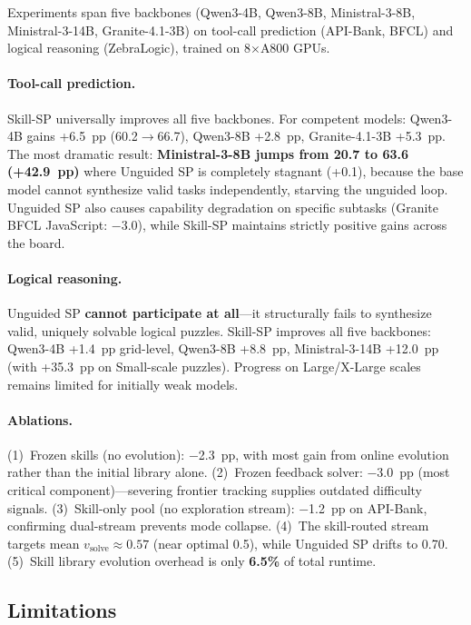 \documentclass[11pt,a4paper]{article}
\begin{document}
Experiments span five backbones (Qwen3-4B, Qwen3-8B, Ministral-3-8B, Ministral-3-14B, Granite-4.1-3B) on tool-call prediction (API-Bank, BFCL) and logical reasoning (ZebraLogic), trained on 8$\times$A800 GPUs.

\paragraph{Tool-call prediction.}
Skill-SP universally improves all five backbones. For competent models: Qwen3-4B gains +6.5~pp (60.2$\to$66.7), Qwen3-8B +2.8~pp, Granite-4.1-3B +5.3~pp. The most dramatic result: \textbf{Ministral-3-8B jumps from 20.7 to 63.6 (+42.9~pp)} where Unguided SP is completely stagnant (+0.1), because the base model cannot synthesize valid tasks independently, starving the unguided loop. Unguided SP also causes capability degradation on specific subtasks (Granite BFCL JavaScript: $-$3.0), while Skill-SP maintains strictly positive gains across the board.

\paragraph{Logical reasoning.}
Unguided SP \textbf{cannot participate at all}---it structurally fails to synthesize valid, uniquely solvable logical puzzles. Skill-SP improves all five backbones: Qwen3-4B +1.4~pp grid-level, Qwen3-8B +8.8~pp, Ministral-3-14B +12.0~pp (with +35.3~pp on Small-scale puzzles). Progress on Large/X-Large scales remains limited for initially weak models.

\paragraph{Ablations.}
(1)~Frozen skills (no evolution): $-$2.3~pp, with most gain from online evolution rather than the initial library alone. (2)~Frozen feedback solver: $-$3.0~pp (most critical component)---severing frontier tracking supplies outdated difficulty signals. (3)~Skill-only pool (no exploration stream): $-$1.2~pp on API-Bank, confirming dual-stream prevents mode collapse. (4)~The skill-routed stream targets mean $v_{\text{solve}} \approx 0.57$ (near optimal 0.5), while Unguided SP drifts to 0.70. (5)~Skill library evolution overhead is only \textbf{6.5\%} of total runtime.

\subsection{Limitations}
\end{document}
